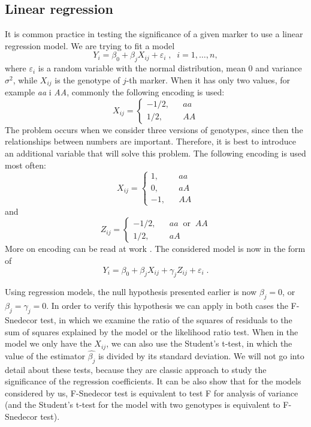 \documentclass[]{MathAppl18}
\begin{document}
\subsection{Linear regression}
It is common practice in testing the significance of a given marker to use a linear regression model. We are trying to fit a model
$$Y_i=\beta_0 + \beta_j X_{ij} + \varepsilon_i\;,\;\;i=1,\ldots,n,$$
where $\varepsilon_i$ is a random variable with the normal distribution, mean 0 and variance $\sigma^2$, while $X_{ij}$ is the genotype of  $j$-th marker. When it has only two values, for example {\it aa} i {\it AA}, commonly the following encoding is used:
$$X_{ij}=\left\{\begin{array}{ccc}
-1/2,&&aa\\
1/2,&&AA
\end{array}
\right.$$
The problem occurs when we consider three versions of genotypes, since then the relationships between numbers are important. Therefore, it is best to introduce an additional variable that will solve this problem. The following encoding is used most often:
$$X_{ij}=\left\{\begin{array}{ccc}
1,&&aa\\
0,&&aA\\
-1,&&AA
\end{array}
\right.$$
and
$$Z_{ij}=\left\{\begin{array}{ccc}
-1/2,&&aa\;\; \mbox{or}\;\; AA\\
1/2,&&aA
\end{array}
\right.$$
More on encoding can be read at work \cite{YosKunTak1998:Heart}. The considered model is now in the form of 
$$Y_i=\beta_0 + \beta_j X_{ij} + \gamma_j Z_{ij}+ \varepsilon_i\;.$$

Using regression models, the null hypothesis presented earlier is now $\beta_j=0$, or $\beta_j=\gamma_j=0$. In order to verify this hypothesis we can apply in both cases the F-Snedecor test, in which we examine the ratio of the squares of residuals to the sum of squares explained by the model or the likelihood ratio test. When in the model we only have the $X_{ij}$, we can also use the Student's  t-test, in which the value of the estimator $\hat{\beta_j}$ is divided by its standard deviation. We will not go into detail about these tests, because they are classic approach to study the significance of the regression coefficients. It can be also show that for the models considered by us, F-Snedecor test is equivalent to test F for analysis of variance (and the Student's t-test for the model with two genotypes is equivalent to F-Snedecor test).
\end{document}
